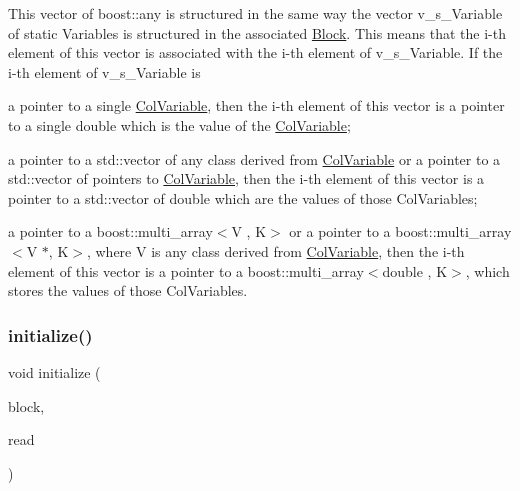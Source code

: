 This vector of boost\+::any is structured in the same way the vector v\+\_\+s\+\_\+\+Variable of static Variables is structured in the associated \mbox{\hyperlink{class_s_m_spp__di__unipi__it_1_1_block}{Block}}. This means that the i-\/th element of this vector is associated with the i-\/th element of v\+\_\+s\+\_\+\+Variable. If the i-\/th element of v\+\_\+s\+\_\+\+Variable is


\begin{DoxyItemize}
\item a pointer to a single \mbox{\hyperlink{class_s_m_spp__di__unipi__it_1_1_col_variable}{Col\+Variable}}, then the i-\/th element of this vector is a pointer to a single double which is the value of the \mbox{\hyperlink{class_s_m_spp__di__unipi__it_1_1_col_variable}{Col\+Variable}};
\item a pointer to a std\+::vector of any class derived from \mbox{\hyperlink{class_s_m_spp__di__unipi__it_1_1_col_variable}{Col\+Variable}} or a pointer to a std\+::vector of pointers to \mbox{\hyperlink{class_s_m_spp__di__unipi__it_1_1_col_variable}{Col\+Variable}}, then the i-\/th element of this vector is a pointer to a std\+::vector of double which are the values of those Col\+Variables;
\item a pointer to a boost\+::multi\+\_\+array$<$\+V , K$>$ or a pointer to a boost\+::multi\+\_\+array$<$\+V $\ast$, K$>$, where V is any class derived from \mbox{\hyperlink{class_s_m_spp__di__unipi__it_1_1_col_variable}{Col\+Variable}}, then the i-\/th element of this vector is a pointer to a boost\+::multi\+\_\+array$<$double , K$>$, which stores the values of those Col\+Variables. 
\end{DoxyItemize}\mbox{\label{class_s_m_spp__di__unipi__it_1_1_col_variable_solution_aa887c8a803bff8a2a7e76e4e809a6f8d}} 
\subsubsection{\texorpdfstring{initialize()}{initialize()}}
{\footnotesize\ttfamily void initialize (\begin{DoxyParamCaption}\item[{const \mbox{\hyperlink{class_s_m_spp__di__unipi__it_1_1_block}{Block}} $\ast$const}]{block,  }\item[{bool}]{read }\end{DoxyParamCaption})\hspace{0.3cm}{\ttfamily [protected]}}



